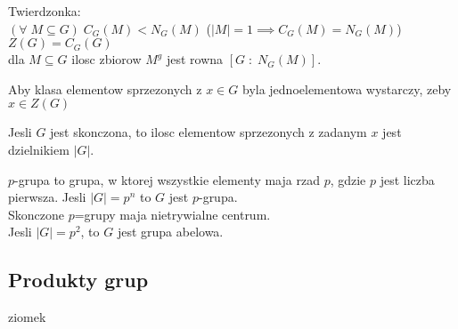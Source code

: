 \begin{multicols}{2}
    Twierdzonka:\smallskip\\
    \point $(\forall\; M\subseteq G)\;C_G(M)<N_G(M)$ ($|M| = 1\implies C_G(M)=N_G(M)$)\smallskip\\
    \point $Z(G)=C_G(G)$\smallskip\\
    \point dla $M\subseteq G$ ilosc zbiorow $M^g$ jest rowna $[G\;:\;N_G(M)]$.\medskip

    Aby klasa elementow sprzezonych z $x\in G$ byla jednoelementowa wystarczy, zeby $x\in Z(G)$\medskip
    
    Jesli $G$ jest skonczona, to ilosc elementow sprzezonych z zadanym $x$ jest dzielnikiem $|G|$.\medskip

    {\color{acc}$p$-grupa} to grupa, w ktorej wszystkie elementy maja rzad $p$, gdzie $p$ jest liczba pierwsza. Jesli $|G|=p^n$ to $G$ jest $p$-grupa.\smallskip\\
    Skonczone $p$=grupy maja {\color{acc}nietrywialne centrum}.\smallskip\\
    Jesli $|G|=p^2$, to $G$ jest grupa abelowa.

\end{multicols}\bigskip

\bigskip

\subsection{Produkty grup}
\begin{multicols*}{2}
    ziomek
\end{multicols*}